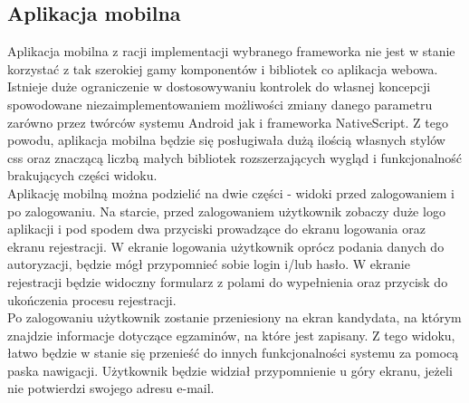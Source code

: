 \documentclass{article}
\begin{document}
\subsection{Aplikacja mobilna}
Aplikacja mobilna z racji implementacji wybranego frameworka nie jest w stanie korzystać z tak szerokiej gamy komponentów i bibliotek co aplikacja webowa. Istnieje duże ograniczenie w dostosowywaniu kontrolek do własnej koncepcji spowodowane niezaimplementowaniem możliwości zmiany danego parametru zarówno przez twórców systemu Android jak i frameworka NativeScript. Z tego powodu, aplikacja mobilna będzie się posługiwała dużą ilością własnych stylów css oraz znaczącą liczbą małych bibliotek rozszerzających wygląd i funkcjonalność brakujących części widoku. \\

Aplikację mobilną można podzielić na dwie części - widoki przed zalogowaniem i po zalogowaniu. 
Na starcie, przed zalogowaniem użytkownik zobaczy duże logo aplikacji i pod spodem dwa przyciski prowadzące do ekranu logowania oraz ekranu rejestracji. W ekranie logowania użytkownik oprócz podania danych do autoryzacji, będzie mógł przypomnieć sobie login i/lub hasło. W ekranie rejestracji będzie widoczny formularz z polami do wypełnienia oraz przycisk do ukończenia procesu rejestracji. \\
Po zalogowaniu użytkownik zostanie przeniesiony na ekran kandydata, na którym znajdzie informacje dotyczące egzaminów, na które jest zapisany. Z tego widoku, łatwo będzie w stanie się przenieść do innych funkcjonalności systemu za pomocą paska nawigacji. Użytkownik będzie widział przypomnienie u góry ekranu, jeżeli nie potwierdzi swojego adresu e-mail.
\end{document}
